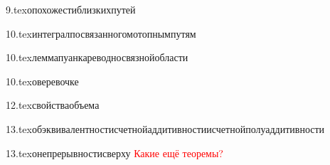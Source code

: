 {9.tex}{опохожестиблизкихпутей}

{10.tex}{интегралпосвязанногомотопнымпутям}

{10.tex}{леммапуанкареводносвязнойобласти}

{10.tex}{оверевочке}

{12.tex}{свойстваобъема}

{13.tex}{обэквивалентностисчетнойаддитивностиисчетнойполуаддитивности}

{13.tex}{онепрерывностисверху}
\textcolor{red}{Какие ещё теоремы?}

